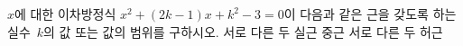 $x$에 대한 이차방정식 $x^2+(2k-1)x+k^2-3=0$이 다음과 같은 근을 갖도록 하는 실수~$k$의 값 또는 값의 범위를 구하시오.
 서로 다른 두 실근
 중근
 서로 다른 두 허근
